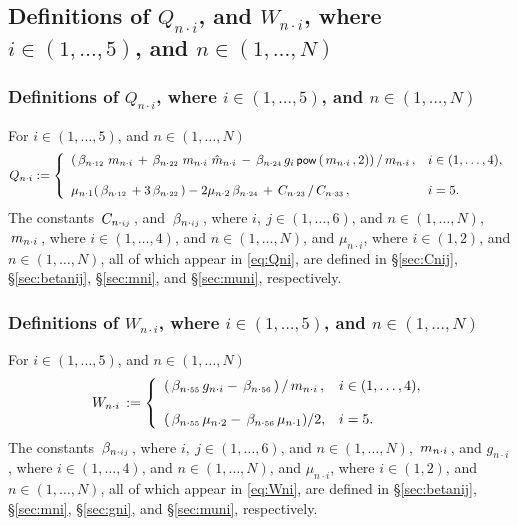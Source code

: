 \documentclass[preprint,12pt,times]{elsarticle}
\newcommand{\plus}[1]{\hat{#1}}
\numberwithin{equation}{section}
\newcommand{\pr}[1]{\left( #1 \right)}
\newcommand{\p}{\,\textsf{\small pow}}
\newcommand{\msub}[2]{
\IfEqCase{#2}{
      {i}{\, m_{#1\cdot #2}\,}%
  }[\,m_{#1\cdot {\scriptscriptstyle #2}}\,]}
\newcommand{\gsub}[2]{g_{#1\cdot #2}}
\newcommand{\Qsub}[2]{Q_{#1\cdot #2}}
\newcommand{\Wsub}[2]{
\IfEqCase{#2}{
      {i}{\, W_{#1\cdot #2}\,}%
  }[\,W_{#1\cdot {\scriptscriptstyle #2}}\,]}
\newcommand{\musub}[2]{\mu_{#1\cdot #2}}
\newcommand{\betasub}[2]{
\IfEqCase{#2}{
       {xxxx}{\,\beta_{ {#1}\cdot { #2}}\,}%
   }[\,\beta_{ {#1}\cdot {\scriptscriptstyle #2}}\,]}
\newcommand{\Csub}[2]{
   \IfEqCase{#2}{
          {xxxx}{\,\beta_{ {#1}\cdot { #2}}\,}%
      }[\,C_{ {#1}\cdot {\scriptscriptstyle #2}}\,]}
\newcommand{\intwo}{\in(1,2)}
\newcommand{\infour}{\in(1,\ldots,4)}
\newcommand{\infive}{\in(1,\ldots,5)}
\newcommand{\insix}{\in(1,\ldots,6)}
\newcommand{\inN}{\in(1,\ldots,N)}
\newcommand{\Subs}[3]{
\IfEqCase{#3}{
		{i}{\,#1_{ {#2}\cdot { \scriptstyle #3}}\,}%
	}[\,#1_{ {#2}\cdot {\scriptscriptstyle #3}}\,]}
\renewcommand{\>}{$\Rightarrow$}
\begin{document}
\subsection{Definitions of $\Qsub{n}{i}$, and $W_{n\cdot i}$, where $i\in (1,\ldots,5)$, and $n\in (1,\ldots,N)$} %
\label{sec:Qni}

\subsubsection{Definitions of $\Qsub{n}{i}$, where $i\in (1,\ldots,5)$, and $n\in (1,\ldots,N)$} %

For $i\infive$, and $n\in(1,\ldots,N)$
\begin{equation}
  \Qsub{n}{i} := 
 \left\{ 
	 \begin{array}{ll}
   \pr{\betasub{n}{12}\msub{n}{i} + \betasub{n}{22}\msub{n}{i}\Subs{\plus{m}}{n}{i} - \betasub{n}{24} g_i \p\pr{\msub{n}{i},2}}/\msub{n}{i}, & i\infour, \\ \\
\musub{n}{1}(\betasub{n}{12} + 3\betasub{n}{22})-2\musub{n}{2}\betasub{n}{24} + \Csub{n}{23}/\Csub{n}{33}, & i=5.
	 \end{array} 
\right.
\label{eq:Qni}
\end{equation}%
The constants $\Csub{n}{ij}$, and $\betasub{n}{ij}$, where $i,~j\insix$, and $n\inN$,  $\msub{n}{i}$, where $i\infour$, and $n\inN$, and $\musub{n}{i}$, where $i\intwo$, and $n\inN$, all of which appear in \eqref{eq:Qni}, are defined in \S\ref{sec:Cnij}, \S\ref{sec:betanij}, \S\ref{sec:mni}, and \S\ref{sec:muni}, respectively. %

\subsubsection{Definitions of $W_{n\cdot i}$, where $i\in (1,\ldots,5)$, and $n\in (1,\ldots,N)$} %
\label{sec:Wni}



For $i\infive$, and $n\in(1,\ldots,N)$
\begin{equation}
  \Wsub{n}{i} := 
 \left\{ 
	\begin{array}{ll}
		\pr{\betasub{n}{55} \gsub{n}{i} - \betasub{n}{56}}/\msub{n}{i}, & i\infour, \\ \\
		(\betasub{n}{55}\musub{n}{2} - \betasub{n}{56}\musub{n}{1})/2, & i=5.
	 \end{array} 
\right.
\label{eq:Wni}
\end{equation} %
The constants $\betasub{n}{ij}$, where $i,~j\insix$, and $n\inN$,  $\msub{n}{i}$, and $\gsub{n}{i}$, where $i\infour$, and $n\inN$, and $\musub{n}{i}$, where $i\intwo$, and $n\inN$, all of which appear in \eqref{eq:Wni}, are defined in \S\ref{sec:betanij}, \S\ref{sec:mni}, \S\ref{sec:gni}, and \S\ref{sec:muni}, respectively. %
\end{document}
